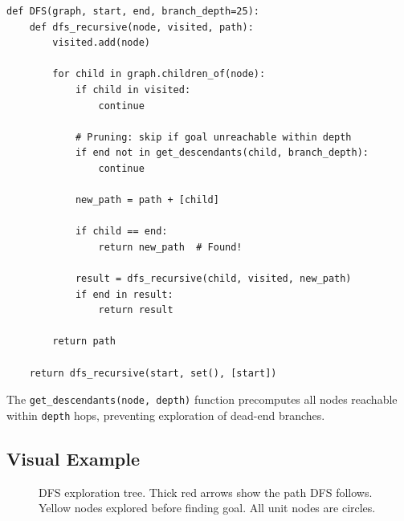 \documentclass[11pt,a4paper]{report}
\begin{document}
\begin{lstlisting}[style=pythonstyle, caption={DFS with descendant filtering}]
def DFS(graph, start, end, branch_depth=25):
    def dfs_recursive(node, visited, path):
        visited.add(node)
        
        for child in graph.children_of(node):
            if child in visited:
                continue
            
            # Pruning: skip if goal unreachable within depth
            if end not in get_descendants(child, branch_depth):
                continue
            
            new_path = path + [child]
            
            if child == end:
                return new_path  # Found!
            
            result = dfs_recursive(child, visited, new_path)
            if end in result:
                return result
        
        return path
    
    return dfs_recursive(start, set(), [start])
\end{lstlisting}

The \texttt{get\_descendants(node, depth)} function precomputes all nodes reachable within \texttt{depth} hops, preventing exploration of dead-end branches.

\subsection{Visual Example}

\begin{figure}[h]
\centering
{}
\caption{DFS exploration tree. Thick red arrows show the path DFS follows. Yellow nodes explored before finding goal. All unit nodes are circles.}
\label{fig:dfs_tree}
\end{figure}
\end{document}
